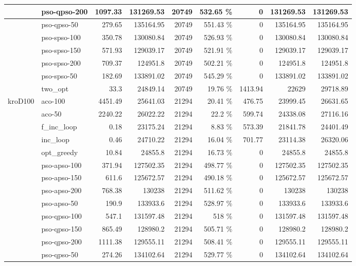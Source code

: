 \documentclass[conference]{IEEEtran}
\begin{document}
\begin{center}
\begin{longtable}[ht]{|l|l|r|r|r|r|r|r|r|}
 & pso-qpso-200 & 1097.33 & 131269.53 & 20749 & 532.65 \% & 0 & 131269.53 & 131269.53 \\ \hline
 & pso-qpso-50 & 279.65 & 135164.95 & 20749 & 551.43 \% & 0 & 135164.95 & 135164.95 \\ \hline
 & pso-spso-100 & 350.78 & 130080.84 & 20749 & 526.93 \% & 0 & 130080.84 & 130080.84 \\ \hline
 & pso-spso-150 & 571.93 & 129039.17 & 20749 & 521.91 \% & 0 & 129039.17 & 129039.17 \\ \hline
 & pso-spso-200 & 709.37 & 124951.8 & 20749 & 502.21 \% & 0 & 124951.8 & 124951.8 \\ \hline
 & pso-spso-50 & 182.69 & 133891.02 & 20749 & 545.29 \% & 0 & 133891.02 & 133891.02 \\ \hline
 & two\_opt & 33.3 & 24849.14 & 20749 & 19.76 \% & 1413.94 & 22629 & 29718.89 \\ \hline
kroD100 & aco-100 & 4451.49 & 25641.03 & 21294 & 20.41 \% & 476.75 & 23999.45 & 26631.65 \\ \hline
 & aco-50 & 2240.22 & 26022.22 & 21294 & 22.2 \% & 599.74 & 24338.08 & 27116.16 \\ \hline
 & f\_inc\_loop & 0.18 & 23175.24 & 21294 & 8.83 \% & 573.39 & 21841.78 & 24401.49 \\ \hline
 & inc\_loop & 0.46 & 24710.22 & 21294 & 16.04 \% & 701.77 & 23114.38 & 26320.06 \\ \hline
 & opt\_greedy & 10.84 & 24855.8 & 21294 & 16.73 \% & 0 & 24855.8 & 24855.8 \\ \hline
 & pso-apso-100 & 371.94 & 127502.35 & 21294 & 498.77 \% & 0 & 127502.35 & 127502.35 \\ \hline
 & pso-apso-150 & 611.6 & 125672.57 & 21294 & 490.18 \% & 0 & 125672.57 & 125672.57 \\ \hline
 & pso-apso-200 & 768.38 & 130238 & 21294 & 511.62 \% & 0 & 130238 & 130238 \\ \hline
 & pso-apso-50 & 190.9 & 133933.6 & 21294 & 528.97 \% & 0 & 133933.6 & 133933.6 \\ \hline
 & pso-qpso-100 & 547.1 & 131597.48 & 21294 & 518 \% & 0 & 131597.48 & 131597.48 \\ \hline
 & pso-qpso-150 & 865.49 & 128980.2 & 21294 & 505.71 \% & 0 & 128980.2 & 128980.2 \\ \hline
 & pso-qpso-200 & 1111.38 & 129555.11 & 21294 & 508.41 \% & 0 & 129555.11 & 129555.11 \\ \hline
 & pso-qpso-50 & 274.26 & 134102.64 & 21294 & 529.77 \% & 0 & 134102.64 & 134102.64 \\ \hline

\end{longtable}
\end{center}
\end{document}

